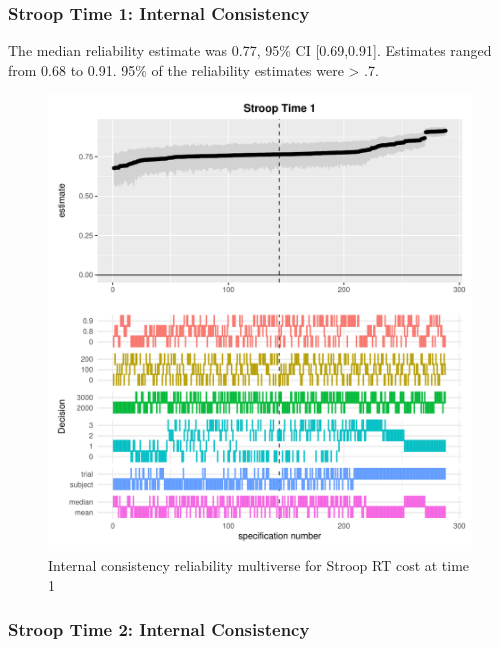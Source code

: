 \documentclass[english,man,floatsintext]{apa6}
\begin{document}
\hypertarget{stroop-time-1-internal-consistency}{%
\subsubsection{Stroop Time 1: Internal Consistency}\label{stroop-time-1-internal-consistency}}

The median reliability estimate was 0.77, 95\% CI {[}0.69,0.91{]}. Estimates ranged from 0.68 to 0.91. 95\% of the reliability estimates were \textgreater{} .7.

\begin{figure}
\centering
\includegraphics{Reliability_Multiverse_files/figure-latex/unnamed-chunk-5-1.pdf}
\caption{\label{fig:unnamed-chunk-5}Internal consistency reliability multiverse for Stroop RT cost at time 1}
\end{figure}

\newpage

\hypertarget{stroop-time-2-internal-consistency}{%
\subsubsection{Stroop Time 2: Internal Consistency}\label{stroop-time-2-internal-consistency}}
\end{document}
